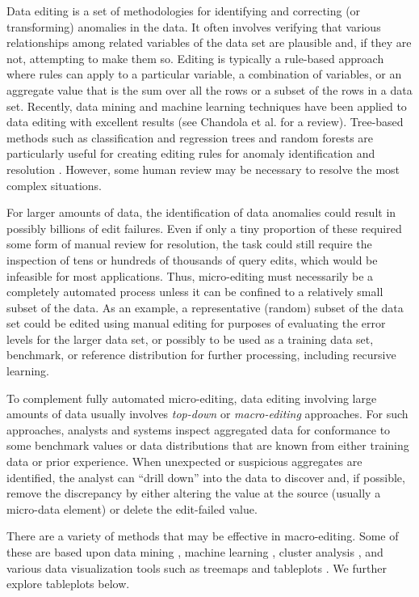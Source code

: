 \documentclass[]{krantz}
\begin{document}
Data editing is a set of methodologies for identifying and correcting
(or transforming) anomalies in the data. It often involves verifying
that various relationships among related variables of the data set are
plausible and, if they are not, attempting to make them so. Editing is
typically a rule-based approach where rules can apply to a particular
variable, a combination of variables, or an aggregate value that is the
sum over all the rows or a subset of the rows in a data set. Recently,
data mining and machine learning techniques have been applied to data
editing with excellent results (see Chandola et al.
\citet{chandola2009anomaly} for a review). Tree-based methods such as
classification and regression trees and random forests are particularly
useful for creating editing rules for anomaly identification and
resolution \citep{petrakos2004new}. However, some human review may be
necessary to resolve the most complex situations.

For larger amounts of data, the identification of data anomalies could
result in possibly billions of edit failures. Even if only a tiny
proportion of these required some form of manual review for resolution,
the task could still require the inspection of tens or hundreds of
thousands of query edits, which would be infeasible for most
applications. Thus, micro-editing must necessarily be a completely
automated process unless it can be confined to a relatively small subset
of the data. As an example, a representative (random) subset of the data
set could be edited using manual editing for purposes of evaluating the
error levels for the larger data set, or possibly to be used as a
training data set, benchmark, or reference distribution for further
processing, including recursive learning.

To complement fully automated micro-editing, data editing involving
large amounts of data usually involves \emph{top-down} or
\emph{macro-editing} approaches. For such approaches, analysts and
systems inspect aggregated data for conformance to some benchmark values
or data distributions that are known from either training data or prior
experience. When unexpected or suspicious aggregates are identified, the
analyst can ``drill down'' into the data to discover and, if possible,
remove the discrepancy by either altering the value at the source
(usually a micro-data element) or delete the edit-failed value.

There are a variety of methods that may be effective in macro-editing.
Some of these are based upon data mining \citep{natarajan2010data},
machine learning \citep{Clarke2014}, cluster analysis
\citep{duan2009cluster, he2003discovering}, and various data
visualization tools such as treemaps
\citep{johnson1991tree, shneiderman1992tree, tennekes2011top} and
tableplots
\citep{tennekes2013visualizing, puts2015finding, Tennekes2012}. We
further explore tableplots below.
\end{document}
